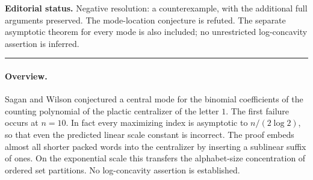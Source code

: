 \documentclass[11pt,a4paper]{article}
\begin{document}
\noindent\textbf{Editorial status.} Negative resolution: a counterexample, with the additional full arguments preserved. The mode-location conjecture is refuted. The separate asymptotic theorem for every mode is also included; no unrestricted log-concavity assertion is inferred.

\smallskip\hrule\medskip



\begingroup

\setcounter{equation}{0}
\renewcommand{\theequation}{\thesection.\arabic{equation}}
\renewcommand{\theHequation}{R24K.\arabic{equation}}
\paragraph{Overview.}
Sagan and Wilson conjectured a central mode for the binomial coefficients of the counting polynomial of the plactic centralizer of the letter $1$. The first failure occurs at $n=10$. In fact every maximizing index is asymptotic to $n/(2\log 2)$, so that even the predicted linear scale constant is incorrect. The proof embeds almost all shorter packed words into the centralizer by inserting a sublinear suffix of ones. On the exponential scale this transfers the alphabet-size concentration of ordered set partitions. No log-concavity assertion is established.
\end{document}
